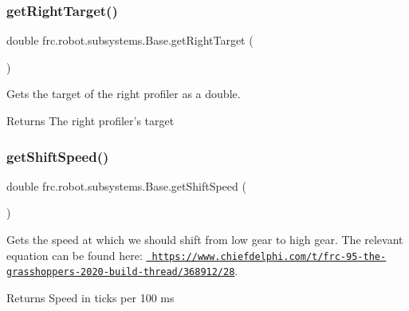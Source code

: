 \subsubsection{\texorpdfstring{getRightTarget()}{getRightTarget()}}
{\footnotesize\ttfamily double frc.\+robot.\+subsystems.\+Base.\+get\+Right\+Target (\begin{DoxyParamCaption}{ }\end{DoxyParamCaption})\hspace{0.3cm}{\ttfamily [inline]}}



Gets the target of the right profiler as a double. 

\begin{DoxyReturn}{Returns}
The right profiler’s target 
\end{DoxyReturn}
\mbox{\label{classfrc_1_1robot_1_1subsystems_1_1_base_a7bbf51639ef6ea065c1ef065d1e9520b}} 
\subsubsection{\texorpdfstring{getShiftSpeed()}{getShiftSpeed()}}
{\footnotesize\ttfamily double frc.\+robot.\+subsystems.\+Base.\+get\+Shift\+Speed (\begin{DoxyParamCaption}{ }\end{DoxyParamCaption})\hspace{0.3cm}{\ttfamily [inline]}}



Gets the speed at which we should shift from low gear to high gear. The relevant equation can be found here\+: \href{https://www.chiefdelphi.com/t/frc-95-the-grasshoppers-2020-build-thread/368912/28}{\texttt{ https\+://www.\+chiefdelphi.\+com/t/frc-\/95-\/the-\/grasshoppers-\/2020-\/build-\/thread/368912/28}}. 

\begin{DoxyReturn}{Returns}
Speed in ticks per 100 ms 
\end{DoxyReturn}
\mbox{\label{classfrc_1_1robot_1_1subsystems_1_1_base_aa41ac2660df6722e9d0c9e143c82fe81}} 
